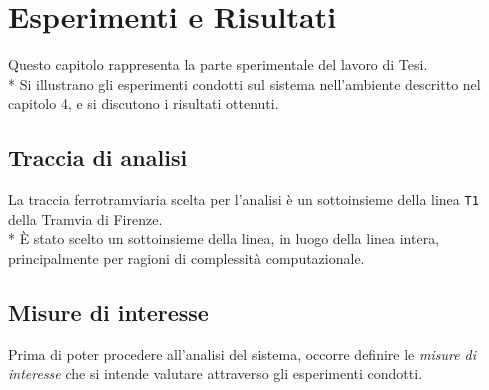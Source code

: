 \chapter{Esperimenti e Risultati}
Questo capitolo rappresenta la parte sperimentale del lavoro di Tesi.\\*
Si illustrano gli esperimenti condotti sul sistema nell'ambiente descritto nel capitolo 4, e si discutono i risultati ottenuti.
\section{Traccia di analisi}
La traccia ferrotramviaria scelta per l'analisi \`e un sottoinsieme della linea \texttt{T1} della Tramvia di Firenze.\\*
\`E stato scelto un sottoinsieme della linea, in luogo della linea intera, principalmente per ragioni di complessit\`a computazionale.
\section{Misure di interesse}
Prima di poter procedere all'analisi del sistema, occorre definire le \emph{misure di interesse} che si intende valutare attraverso gli esperimenti condotti.